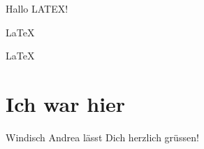\documentclass{article}
\begin{document}
Hallo LATEX!  

\LaTeX 

\huge
\LaTeX 
   
\section{Ich war hier}
Windisch Andrea lässt Dich herzlich grüssen!
\end{document}
